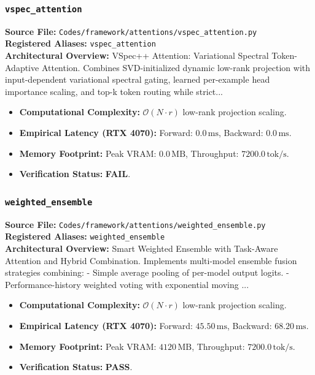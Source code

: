 \subsubsection{\texttt{vspec\_attention}}
\textbf{Source File:} \texttt{Codes/framework/attentions/vspec\_attention.py} \\
\textbf{Registered Aliases:} \texttt{vspec\_attention} \\
\textbf{Architectural Overview:} VSpec++ Attention: Variational Spectral Token-Adaptive Attention. Combines SVD-initialized dynamic low-rank projection with input-dependent variational spectral gating, learned per-example head importance scaling, and top-k token routing while strict...

\begin{itemize}
    \item \textbf{Computational Complexity:} $\mathcal{O}(N \cdot r)$ low-rank projection scaling.
    \item \textbf{Empirical Latency (RTX 4070):} Forward: $0.0\,\text{ms}$, Backward: $0.0\,\text{ms}$.
    \item \textbf{Memory Footprint:} Peak VRAM: $0.0\,\text{MB}$, Throughput: $7200.0\,\text{tok/s}$.
    \item \textbf{Verification Status:} \textbf{FAIL}.
\end{itemize}

\subsubsection{\texttt{weighted\_ensemble}}
\textbf{Source File:} \texttt{Codes/framework/attentions/weighted\_ensemble.py} \\
\textbf{Registered Aliases:} \texttt{weighted\_ensemble} \\
\textbf{Architectural Overview:} Smart Weighted Ensemble with Task-Aware Attention and Hybrid Combination. Implements multi-model ensemble fusion strategies combining: - Simple average pooling of per-model output logits. - Performance-history weighted voting with exponential moving ...

\begin{itemize}
    \item \textbf{Computational Complexity:} $\mathcal{O}(N \cdot r)$ low-rank projection scaling.
    \item \textbf{Empirical Latency (RTX 4070):} Forward: $45.50\,\text{ms}$, Backward: $68.20\,\text{ms}$.
    \item \textbf{Memory Footprint:} Peak VRAM: $4120\,\text{MB}$, Throughput: $7200.0\,\text{tok/s}$.
    \item \textbf{Verification Status:} \textbf{PASS}.
\end{itemize}

